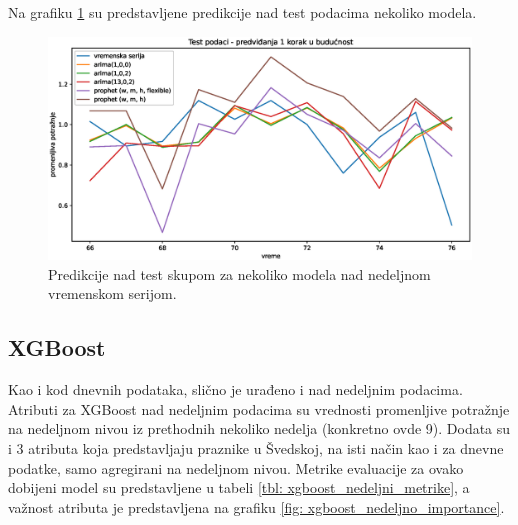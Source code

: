 \documentclass[12pt,oneside]{memoir}
\begin{document}
Na grafiku \ref{fig: nedeljni_test} su predstavljene predikcije nad test podacima nekoliko modela.
\begin{figure}[!ht]
  \centering
  \includegraphics[width=1\textwidth]{./grafici/test_nedeljni_modeli.eps}
  \caption{Predikcije nad test skupom za nekoliko modela nad nedeljnom vremenskom serijom.}
  \label{fig: nedeljni_test}
\end{figure}

\subsection{XGBoost}
Kao i kod dnevnih podataka, slično je urađeno i nad nedeljnim podacima. Atributi za XGBoost nad nedeljnim podacima su vrednosti promenljive potražnje na nedeljnom nivou iz prethodnih nekoliko nedelja (konkretno ovde 9). Dodata su i 3 atributa koja predstavljaju praznike u Švedskoj, na isti način kao i za dnevne podatke, samo agregirani na nedeljnom nivou. Metrike evaluacije za ovako dobijeni model su predstavljene u tabeli \ref{tbl: xgboost_nedeljni_metrike}, a važnost atributa je predstavljena na grafiku \ref{fig: xgboost_nedeljno_importance}.
\end{document}
